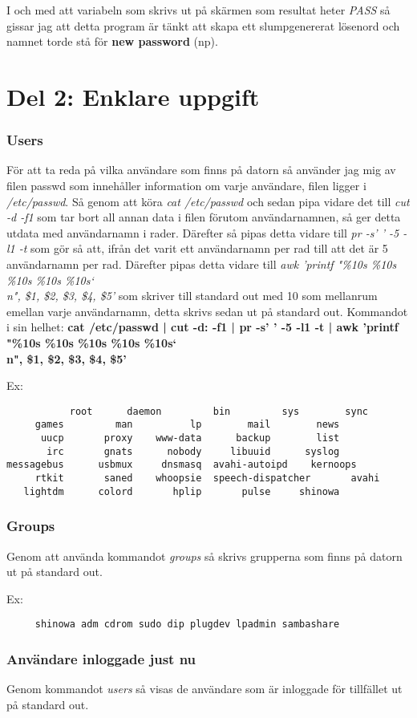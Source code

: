 \documentclass[11pt, titlepage, oneside, a4paper]{article}
\newcommand{\Section}[1]{\section{#1}\vspace{-8pt}}
\newcommand{\Subsubsection}[1]{\vspace{-4pt}\subsubsection{#1}\vspace{-8pt}}
\begin{document}
	I och med att variabeln som skrivs ut på skärmen som resultat heter \emph{PASS} så gissar jag att detta program är tänkt att skapa ett slumpgenererat lösenord
	och namnet torde stå för \textbf{new password} (np).
	
	\Section{Del 2: Enklare uppgift}
	\Subsubsection{Users}
	För att ta reda på vilka användare som finns på datorn så använder jag mig av filen passwd som innehåller information om varje användare, filen ligger i 
	\emph{/etc/passwd}. Så genom att köra \emph{cat /etc/passwd} och sedan pipa vidare det till \emph{cut -d -f1} som tar bort all annan data i filen förutom användarnamnen,
	så ger detta utdata med användarnamn i rader. Därefter så pipas detta vidare till \emph{pr -s' ' -5 -l1 -t} som gör så att, ifrån det varit ett användarnamn per rad till att det
	är 5 användarnamn per rad. Därefter pipas detta vidare till \emph{awk '{printf "\%10s  \%10s  \%10s  \%10s  \%10s\char`\\n", \$1, \$2, \$3, \$4, \$5}'} som skriver till standard out
	med 10 som mellanrum emellan varje användarnamn, detta skrivs sedan ut på standard out.
	\newline
	Kommandot i sin helhet: \newline\textbf{cat /etc/passwd | cut -d: -f1 | pr -s' ' -5 -l1 -t | awk '{printf "\%10s  \%10s  \%10s  \%10s  \%10s\char`\\n", \$1, \$2, \$3, \$4, \$5}'}
	
	Ex:
	\begin{verbatim}
	       root      daemon         bin         sys        sync
     games         man          lp        mail        news
      uucp       proxy    www-data      backup        list
       irc       gnats      nobody     libuuid      syslog
messagebus      usbmux     dnsmasq  avahi-autoipd    kernoops
     rtkit       saned    whoopsie  speech-dispatcher       avahi
   lightdm      colord       hplip       pulse     shinowa

	\end{verbatim}

	\Subsubsection{Groups}
	Genom att använda kommandot \emph{groups} så skrivs grupperna som finns på datorn ut på standard out. 
	
	Ex:
	\begin{verbatim}
	 shinowa adm cdrom sudo dip plugdev lpadmin sambashare
	\end{verbatim}

	\Subsubsection{Användare inloggade just nu}
	Genom kommandot \emph{users} så visas de användare som är inloggade för tillfället ut på standard out.
	
\end{document}
